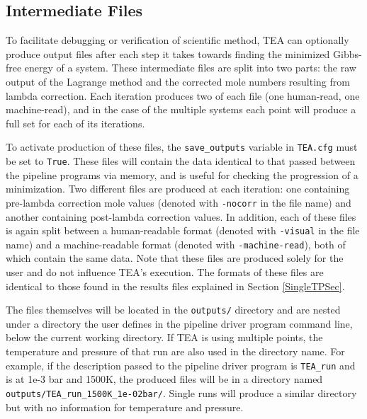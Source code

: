 {%
\subsection{Intermediate Files}
\label{inter}
  To facilitate debugging or verification of scientific method, TEA
  can optionally produce output files after each step it takes towards
  finding the minimized Gibbs-free energy of a system.  These
  intermediate files are split into two parts: the raw output of the
  Lagrange method and the corrected mole numbers resulting from lambda
  correction.  Each iteration produces two of each file (one
  human-read, one machine-read), and in the case of the
  multiple  systems each  point will produce a
  full set for each of its iterations.

  To activate production of these files, the \texttt{save\_outputs}
  variable in \texttt{TEA.cfg} must be set to \texttt{True}.  These
  files will contain the data identical to that passed between the
  pipeline programs via memory, and is useful for checking the
  progression of a minimization.  Two different files are produced at
  each iteration: one containing pre-lambda correction mole values
  (denoted with \texttt{-nocorr} in the file name) and another
  containing post-lambda correction values.  In addition, each of
  these files is again split between a human-readable format (denoted
  with \texttt{-visual} in the file name) and a machine-readable
  format (denoted with \texttt{-machine-read}), both of which contain
  the same data.  Note that these files are produced solely for the
  user and do not influence TEA's execution.  The formats of these
  files are identical to those found in the results files explained in
  Section \ref{SingleTPSec}.
  
  The files themselves will be located in the \texttt{outputs/}
  directory and are nested under a directory the user defines in the
  pipeline driver program command line, below the current working
  directory. If TEA is using multiple  points, the
  temperature and pressure of that run are also used in the directory
  name.  For example, if the description passed to the pipeline driver
  program is \texttt{TEA\_run} and is at 1e-3 bar and 1500K, the
  produced files will be in a directory
  named \newline \texttt{outputs/TEA\_run\_1500K\_1e-02bar/}.
  Single  runs will produce a similar directory but with no
  information for temperature and pressure.
 

}
